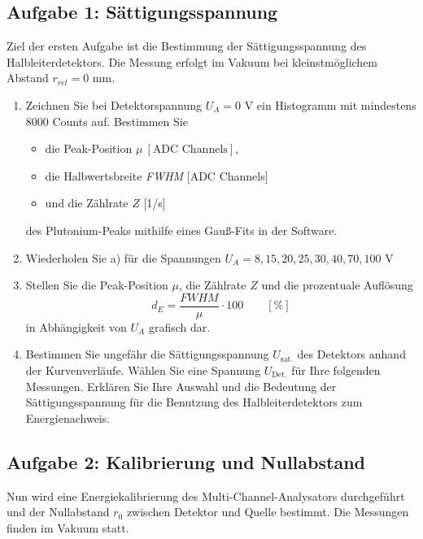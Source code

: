 \subsection{Aufgabe 1: Sättigungsspannung}
Ziel der ersten Aufgabe ist die Bestimmung der Sättigungsspannung des Halbleiterdetektors. Die Messung erfolgt im Vakuum bei kleinstmöglichem Abstand $r_{rel} = 0$ mm.
\begin{enumerate}[label=\textbf{\alph*)}]
	\item Zeichnen Sie bei Detektorspannung $U_A = 0$ V ein Histogramm mit mindestens 8000 Counts auf. Bestimmen Sie 
		\begin{itemize}[nosep]
		\item die Peak-Position $\mu\ [\text{ADC Channels}]$,
		\item die Halbwertsbreite \textit{FWHM} [ADC Channels]
		\item und die Zählrate $Z$ [1/s]
	\end{itemize}
	des Plutonium-Peaks mithilfe eines Gauß-Fits in der Software.
	\item Wiederholen Sie a) für die Spannungen $U_A = 8, 15, 20, 25, 30, 40, 70, 100$ V
	\item Stellen Sie die Peak-Position $\mu$, die Zählrate $Z$ und die prozentuale Auflösung
		\begin{equation}
			d_E = \frac{\textit{FWHM}}{\mu} \cdot 100 \qquad [\%]
		\end{equation}
		in Abhängigkeit von $U_A$ grafisch dar.
	\item Bestimmen Sie ungefähr die Sättigungsspannung $U_{\text{sat.}}$ des Detektors anhand der Kurvenverläufe. Wählen Sie eine Spannung $U_{\text{Det.}}$ für Ihre folgenden Messungen. Erklären Sie Ihre Auswahl und die Bedeutung der Sättigungsspannung für die Benutzung des Halbleiterdetektors zum Energienachweis.
\end{enumerate}

\subsection{Aufgabe 2: Kalibrierung und Nullabstand}
Nun wird eine Energiekalibrierung des Multi-Channel-Analysators durchgeführt und der Nullabstand $r_0$ zwischen Detektor und Quelle bestimmt. Die Messungen finden im Vakuum statt.

